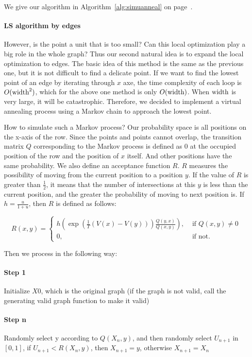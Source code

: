 We give our algorithm in Algorithm~\ref{alg:simuanneal} on page~\pageref{alg:simuanneal}.

\paragraph{LS algorithm by edges}

However, is the point a unit that is too small? Can this local optimization play a big role in the whole graph? Thus our second natural idea is to expand the local optimization to edges. The basic idea of this method is the same as the previous one, but it is not difficult to find a delicate point. If we want to find the lowest point of an edge by iterating through $x$ axe, the time complexity of each loop is $O (\lstinline{width} ^ 2)$, which for the above one method is only $O (\lstinline{width})$. When $\lstinline{width}$ is very large, it will be catastrophic. Therefore, we decided to implement a virtual annealing process using a Markov chain to approach the lowest point.

How to simulate such a Markov process?
Our probability space is all positions on the x-axis of the row. Since the points and points cannot overlap, the transition matrix $Q$ corresponding to the Markov process is defined as 0 at the occupied position of the row and the position of $x$ itself. And other positions have the same probability. We also define an acceptance function $R$. $R$ measures the possibility of moving from the current position to a position $ y $. If the value of $R$ is greater than $\frac{1}{2}$, it means that the number of intersections at this $ y $ is less than the current position, and the greater the probability of moving to next position is. If $h = \frac{u}{1+u}$, then $R$ is defined as follows:

$$ R(x, y) = \left\{
\begin{aligned}
h(\exp(\frac{1}{T}(V(x)-V(y)))\frac{Q(y,x)}{Q(x,y)}),& \text{ if } Q(x, y) \ne 0 \\
0,& \text{ if not.}
\end{aligned}
\right.
$$

Then we process in the following way: 

\paragraph{Step 1} Initialize $X0$, which is the original graph (if the graph is not valid, call the generating valid graph function to make it valid)
\paragraph{Step n} Randomly select y according to $Q (X _n, y)$, and then randomly select $U _ {n + 1}$ in $[0,1]$, if $U _ {n + 1} < R (X _n, y)$, then $X _{n + 1} = y$, otherwise $X _ {n + 1} = X_n$

